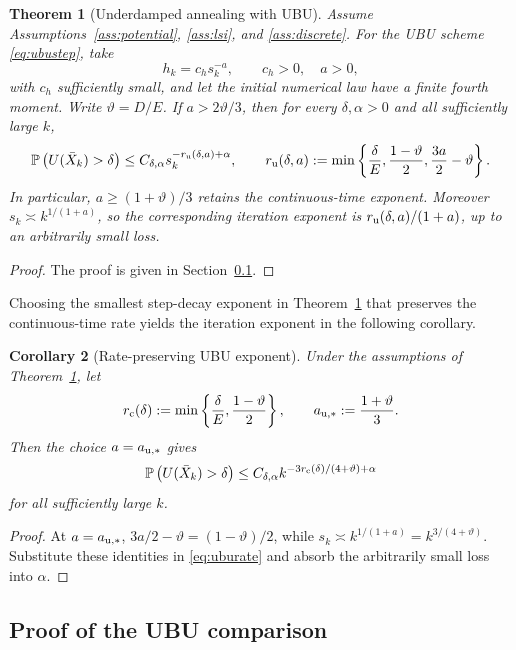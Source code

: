 \documentclass[11pt]{article}
\newtheorem{theorem}{Theorem}[section]
\newtheorem{corollary}[theorem]{Corollary}
\theoremstyle{definition}
\begin{document}
\begin{theorem}[Underdamped annealing with UBU]\label{thm:ubu}
Assume Assumptions~\ref{ass:potential}, \ref{ass:lsi}, and
\ref{ass:discrete}. For the UBU scheme \eqref{eq:ubustep}, take
\[
 h_k=c_hs_k^{-a},\qquad c_h>0,\quad a>0,
\]
with $c_h$ sufficiently small, and let the initial numerical law have a finite
fourth moment. Write $\vartheta=D/E$. If $a>2\vartheta/3$, then for every
$\delta,\alpha>0$ and all sufficiently large $k$,
\begin{equation}\label{eq:uburate}
 \mathbb P\left(U(\bar X_k)>\delta\right)
 \leq C_{\delta,\alpha}s_k^{-r_{\rm u}(\delta,a)+\alpha},
 \qquad
 r_{\rm u}(\delta,a)
 :=\min\left\{\frac\delta E,\frac{1-\vartheta}{2},
                         \frac{3a}{2}-\vartheta\right\}.
\end{equation}
In particular, $a\geq(1+\vartheta)/3$ retains the continuous-time exponent.
Moreover $s_k\asymp k^{1/(1+a)}$, so the corresponding iteration exponent is
$r_{\rm u}(\delta,a)/(1+a)$, up to an arbitrarily small loss.
\end{theorem}

\begin{proof}
The proof is given in Section~\ref{sec:proof_ubu}.
\end{proof}

Choosing the smallest step-decay exponent in Theorem~\ref{thm:ubu} that
preserves the continuous-time rate yields the iteration exponent in the following corollary.

\begin{corollary}[Rate-preserving UBU exponent]\label{cor:ubuiteration}
Under the assumptions of Theorem~\ref{thm:ubu}, let
\[
 r_{\rm c}(\delta):=\min\left\{\frac\delta E,
                    \frac{1-\vartheta}{2}\right\},
 \qquad a_{\rm u,*}:=\frac{1+\vartheta}{3}.
\]
Then the choice $a=a_{\rm u,*}$ gives
\[
 \mathbb P\left(U(\bar X_k)>\delta\right)
 \leq C_{\delta,\alpha}
 k^{-3r_{\rm c}(\delta)/(4+\vartheta)+\alpha}
\]
for all sufficiently large $k$.
\end{corollary}

\begin{proof}
At $a=a_{\rm u,*}$,
$3a/2-\vartheta=(1-\vartheta)/2$, while
$s_k\asymp k^{1/(1+a)}=k^{3/(4+\vartheta)}$. Substitute these identities in
\eqref{eq:uburate} and absorb the arbitrarily small loss into $\alpha$.
\end{proof}

\subsection{Proof of the UBU comparison}\label{sec:proof_ubu}
\end{document}
